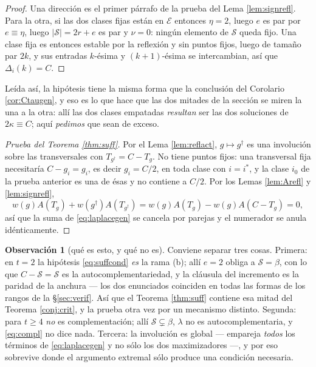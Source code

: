 \documentclass[11pt,reqno]{amsart}
\theoremstyle{plain}
\theoremstyle{definition}
\newtheorem{remark}[theorem]{Observación}
\begin{document}
\begin{proof}
Una dirección es el primer párrafo de la prueba del Lema \ref{lem:signrefl}. Para la otra, si las dos
clases fijas están en $\mathcal{E}$ entonces $\eta=2$, luego $e$ es par por $e\equiv\eta$, luego
$|\mathcal{S}|=2r+e$ es par y $\nu=0$: ningún elemento de $\mathcal{S}$ queda fijo. Una clase fija es
entonces estable por la reflexión y sin puntos fijos, luego de tamaño par $2k$, y sus entradas
$k$-ésima y $(k+1)$-ésima se intercambian, así que $\Delta_i(k)=C$.
\end{proof}

\noindent Leída así, la hipótesis tiene la misma forma que la conclusión del Corolario
\ref{cor:Ctaugen}, y eso es lo que hace que las dos mitades de la sección se miren la una a la otra:
allí las dos clases empatadas \emph{resultan} ser las dos soluciones de $2\kappa\equiv C$; aquí
\emph{pedimos} que sean de exceso.

\begin{proof}[Prueba del Teorema \ref{thm:suff}]
Por el Lema \ref{lem:reflact}, $g\mapsto g^{\dagger}$ es una involución sobre las transversales con
$T_{g^{\dagger}}=C-T_g$. No tiene puntos fijos: una transversal fija necesitaría $C-g_i=g_i$, es
decir $g_i=C/2$, en toda clase con $i=i^{*}$, y la clase $i_0$ de la prueba anterior es una de ésas y
no contiene a $C/2$. Por los Lemas \ref{lem:Arefl} y \ref{lem:signrefl},
\[
w(g)A(T_g)+w(g^{\dagger})A(T_{g^{\dagger}})=w(g)A(T_g)-w(g)A(C-T_g)=0 ,
\]
así que la suma de \eqref{eq:laplacegen} se cancela por parejas y el numerador se anula
idénticamente.
\end{proof}

\begin{remark}[qué es esto, y qué no es]\label{rem:suffscope}
Conviene separar tres cosas. Primera: en $t=2$ la hipótesis \eqref{eq:suffcond} \emph{es} la rama
{\rm(b)}; allí $e=2$ obliga a $\mathcal{S}=\beta$, con lo que $C-\mathcal{S}=\mathcal{S}$ es la
autocomplementariedad, y la cláusula del incremento es la paridad de la anchura --- los dos enunciados
coinciden en todas las formas de los rangos de la \S\ref{sec:verif}. Así que el Teorema
\ref{thm:suff} contiene esa mitad del Teorema \ref{conj:crit}, y la prueba otra vez por un mecanismo
distinto. Segunda: para $t\ge4$ \emph{no} es complementación; allí $\mathcal{S}\subsetneq\beta$,
$\lambda$ no es autocomplementaria, y \eqref{eq:compl} no dice nada. Tercera: la involución es global
--- empareja \emph{todos} los términos de \eqref{eq:laplacegen} y no sólo los dos maximizadores ---, y
por eso sobrevive donde el argumento extremal sólo produce una condición necesaria.
\end{remark}
\end{document}
